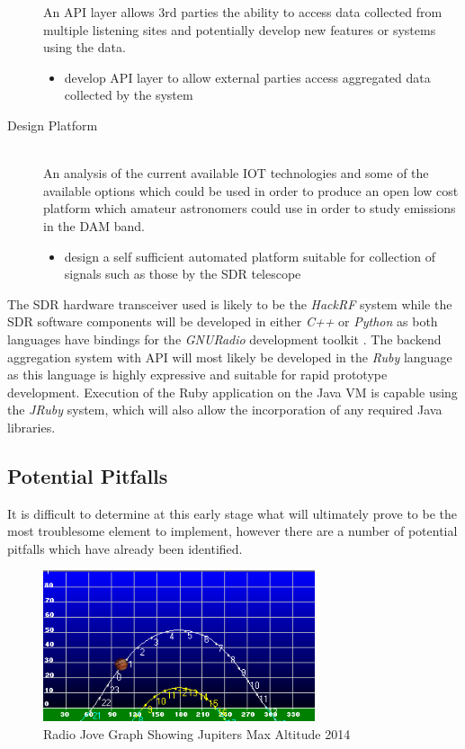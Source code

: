 \documentclass[runningheads,a4paper]{llncs}
\begin{document}
\begin{description}
    An API layer allows 3rd parties the ability to access data collected from multiple listening sites and potentially develop new features or systems using the data.
    \begin{itemize}
      \item develop API layer to allow external parties access aggregated data collected by the system \\
    \end{itemize}
  \item [Design Platform] \hfill \\
    An analysis of the current available \gls{IOT} technologies and some of the available options which could be used in order to produce an open low cost platform which amateur astronomers could use in order to study emissions in the \gls{DAM} band.
    \begin{itemize}
      \item design a self sufficient automated platform suitable for collection of signals such as those by the \gls{SDR} telescope \\
    \end{itemize}
\end{description}

The \gls{SDR} hardware transceiver used is likely to be the \textit{HackRF} system while the \gls{SDR} software components will be developed in either \textit{C++} or \textit{Python} as both languages have bindings for the \textit{GNURadio} development toolkit \citep{gnuradio-14}. The backend aggregation system with API will most likely be developed in the \textit{Ruby} language as this language is highly expressive and suitable for rapid prototype development. Execution of the Ruby application on the Java VM is capable using the \textit{JRuby} system, which will also allow the incorporation of any required Java libraries.


\subsection*{Potential Pitfalls}

It is difficult to determine at this early stage what will ultimately prove to be the most troublesome element to implement, however there are a number of potential pitfalls which have already been identified.

%
\begin{figure}[here]
\centering
\includegraphics[width=8cm]{images/11}
\caption{Radio Jove Graph Showing Jupiters Max Altitude 2014}
\label{fig:jupiter_max_altitude_2014}
\end{figure}
%
\end{document}
